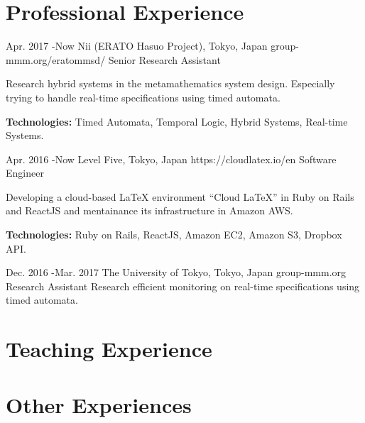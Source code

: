 \documentclass[10pt]{article} %
\begin{document}
\section{Professional Experience}

\job
{Apr. 2017 -}{Now}
{Nii (ERATO Hasuo Project), Tokyo, Japan}
{group-mmm.org/eratommsd/}
{Senior Research Assistant}
{Research hybrid systems in the metamathematics system design. Especially trying to handle real-time specifications using timed automata.\\
\rule{0mm}{5mm}\textbf{Technologies:} Timed Automata, Temporal Logic, Hybrid Systems, Real-time Systems.}

\job
{Apr. 2016 -}{Now}
{Level Five, Tokyo, Japan}
{https://cloudlatex.io/en}
{Software Engineer}
{Developing a cloud-based LaTeX environment ``Cloud LaTeX'' in Ruby on Rails and ReactJS and mentainance its infrastructure in Amazon AWS.\\
\rule{0mm}{5mm}\textbf{Technologies:} Ruby on Rails, ReactJS, Amazon EC2, Amazon S3, Dropbox API.}

\job
{Dec. 2016 -}{Mar. 2017}
{The University of Tokyo, Tokyo, Japan}
{group-mmm.org}
{Research Assistant}
{Research efficient monitoring on real-time specifications using timed automata.}

\section{Teaching Experience}



\section{Other Experiences}

\end{document}
